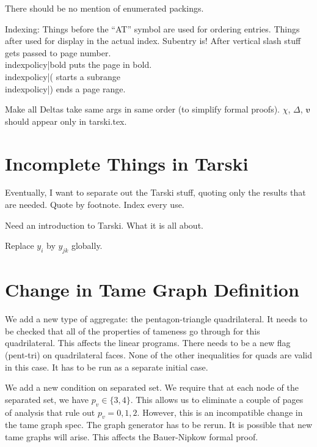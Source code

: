 There should be no mention of enumerated packings.

Indexing: Things before the ``AT'' symbol are used for ordering entries.
Things after used for display in the actual index.
Subentry is!  After vertical slash stuff gets passed to page
number.  \\index{policy|bold}  puts the page in bold.
\\index{policy|(} starts a subrange \\index{policy|)} ends a page range.

Make all Deltas take same args in same order (to simplify formal proofs).
$\chi$, $\Delta$, $\ups$ should appear only in tarski.tex. 

\section{Incomplete Things in Tarski}

Eventually, I want to separate out the Tarski stuff, quoting
only the results that are needed.  Quote by footnote. Index every use.

Need an introduction to Tarski. What it is all about.

Replace $y_i$ by $y_{jk}$ globally.


\section{Change in Tame Graph Definition}

We add a new type of aggregate: the pentagon-triangle quadrilateral.
It needs to be checked that all of the properties of tameness go
through for this quadrilateral.  This affects the linear programs.
There needs to be a new flag (pent-tri) on quadrilateral faces.
None of the other inequalities for quads are valid in this case.
It has to be run as a separate initial case.

We add a new condition on separated set.  We require that 
at each node of the separated set, we have $p_v\in\{3,4\}$.
This allows us to eliminate a couple of pages of analysis
that rule out $p_v=0,1,2$.  However, this is an incompatible
change in the tame graph spec.  The graph generator has to
be rerun.  It is possible that new tame graphs will arise.
This affects the Bauer-Nipkow formal proof.



